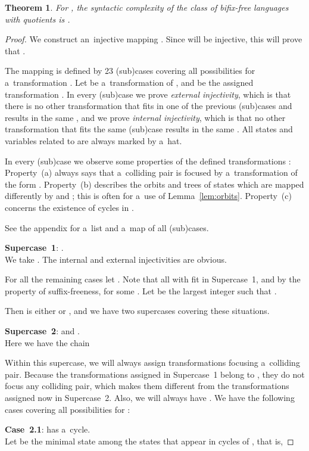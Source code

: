 \documentclass{amsart}
\newtheorem{theorem}{Theorem}
\begin{document}
\begin{theorem}\label{thm:bifix-free_upper_bound}
For , the syntactic complexity of the class of bifix-free languages with  quotients is .
\end{theorem}
\begin{proof}
We construct an~injective mapping .
Since  will be injective, this will prove that .

The mapping  is defined by 23 (sub)cases covering all possibilities for a~transformation .
Let  be a~transformation of , and  be the assigned transformation .
In every (sub)case we prove \emph{external injectivity}, which is that there is no other
transformation  that fits in one of the previous (sub)cases and results in the same , and
we prove \emph{internal injectivity}, which is that no other transformation  that fits  the same (sub)case results in the same .
All states and variables related to  are always marked by a~hat.

In every (sub)case we observe some properties of the defined transformations :
Property~(a) always says that a~colliding pair is focused by a~transformation of the form .
Property~(b) describes the orbits and trees of states which are mapped differently by  and ; this is often for a~use of Lemma~\ref{lem:orbits}.
Property~(c) concerns the existence of cycles in .

See the appendix for a~list and a~map of all (sub)cases.

\textbf{Supercase~1}: .\\
We take .
The internal and external injectivities are obvious.

\noindent For all the remaining cases let .
Note that all  with  fit in Supercase~1, and by the property of suffix-freeness,  for some .
Let  be the largest integer such that .

Then  is either  or , and we have two supercases covering these situations.

\textbf{Supercase~2}:  and .\\
Here we have the chain

Within this supercase, we will always assign transformations  focusing a~colliding pair.
Because the transformations assigned in Supercase~1 belong to , they do not focus any colliding pair, which makes them different from the transformations assigned now in Supercase~2.
Also, we will always have .
We have the following cases covering all possibilities for :

\textbf{Case~2.1}:  has a~cycle.\\
Let  be the minimal state among the states that appear in cycles of , that is,


\end{proof}
\end{document}
